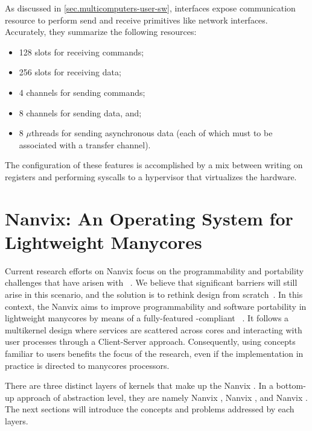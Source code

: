 	As discussed in \autoref{sec.multicomputers-user-sw}, \noc interfaces
	expose communication resource to perform send and receive primitives
	like network interfaces.
	Accurately, they summarize the following resources:

	\begin{itemize}
		\item 128 slots for receiving commands;
		\item 256 slots for receiving data;
		\item 4 channels for sending commands;
		\item 8 channels for sending data, and;
		\item 8 $\mu$threads for sending asynchronous data (each of which must
			to be associated with a transfer channel).
	\end{itemize}

	The configuration of these features is accomplished by a mix between
	writing on \dma registers and performing syscalls to a hypervisor
	that virtualizes the \mppa hardware.

\section{Nanvix: An Operating System for Lightweight Manycores}
\label{sec.nanvix}

	Current research efforts on Nanvix \os focus on the programmability and portability
	challenges that have arisen with \lightweight \manycores~\cite{christgau2017, gamell2012, serres2011}.
	We believe that significant barriers will still arise in this scenario, and the
	solution is to rethink \os design from scratch~\cite{penna:compas19, penna2019}.
	In this context, the Nanvix \os aims to improve programmability and
	software portability in lightweight manycores by means of a fully-featured
	\posix-compliant \os~\cite{penna:compas19}.
	It follows a multikernel design where \os services are scattered across cores and
	interacting with user processes through a Client-Server approach.
	Consequently, using concepts familiar to \os users benefits the focus of the research,
	even if the implementation in practice is directed to manycores processors.

	
	There are three distinct layers of kernels that make up the Nanvix \os.
	In a bottom-up approach of abstraction level, they are namely Nanvix \hal,
	Nanvix \microkernel, and Nanvix \multikernel.
	The next sections will introduce the concepts and problems addressed by each layers.

